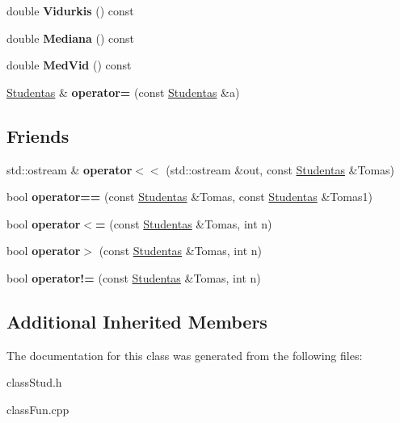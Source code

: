 \begin{DoxyCompactItemize}
double {\bfseries Vidurkis} () const
\item 
\mbox{\label{classStudentas_ab93a6ee41fe3af3303dc39c5d77624ee}} 
double {\bfseries Mediana} () const
\item 
\mbox{\label{classStudentas_a35dbd6700d69cc38ec5d7a1ab16844b2}} 
double {\bfseries Med\+Vid} () const
\item 
\mbox{\label{classStudentas_ac086d515fb2c07f90f08f9a0b609b943}} 
\hyperlink{classStudentas}{Studentas} \& {\bfseries operator=} (const \hyperlink{classStudentas}{Studentas} \&a)
\end{DoxyCompactItemize}
\subsection*{Friends}
\begin{DoxyCompactItemize}
\item 
\mbox{\label{classStudentas_a562a83c4ccd90e2e660cb1e98f8a4f6b}} 
std\+::ostream \& {\bfseries operator$<$$<$} (std\+::ostream \&out, const \hyperlink{classStudentas}{Studentas} \&Tomas)
\item 
\mbox{\label{classStudentas_ad6040355f7a0bec461f41b917885a0e1}} 
bool {\bfseries operator==} (const \hyperlink{classStudentas}{Studentas} \&Tomas, const \hyperlink{classStudentas}{Studentas} \&Tomas1)
\item 
\mbox{\label{classStudentas_a2359d44ae026b636daadd3d03dc0b6e3}} 
bool {\bfseries operator$<$=} (const \hyperlink{classStudentas}{Studentas} \&Tomas, int n)
\item 
\mbox{\label{classStudentas_acbf06321841c12738b8973dc5a43cb3a}} 
bool {\bfseries operator$>$} (const \hyperlink{classStudentas}{Studentas} \&Tomas, int n)
\item 
\mbox{\label{classStudentas_abf81d8c2ee78ae87087062f9d099b759}} 
bool {\bfseries operator!=} (const \hyperlink{classStudentas}{Studentas} \&Tomas, int n)
\end{DoxyCompactItemize}
\subsection*{Additional Inherited Members}


The documentation for this class was generated from the following files\+:\begin{DoxyCompactItemize}
\item 
class\+Stud.\+h\item 
class\+Fun.\+cpp\end{DoxyCompactItemize}
